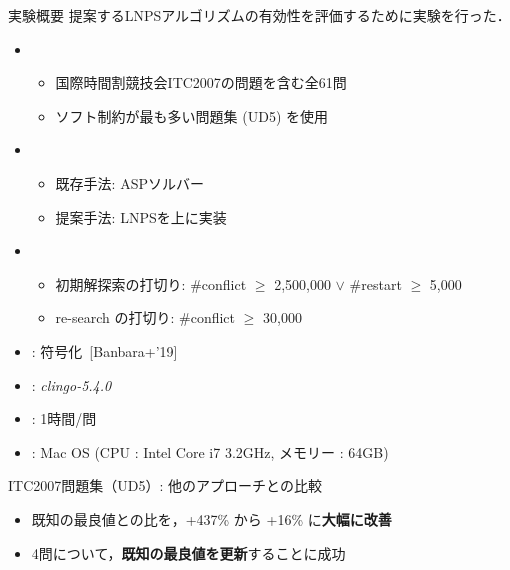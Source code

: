 \documentclass[11pt,dvipdfmx]{beamer}
\begin{document}
\begin{frame}{実験概要}
  提案するLNPSアルゴリズムの有効性を評価するために実験を行った．
  \bigskip
  \begin{itemize}
  \item {}
    \begin{itemize}
    \item 国際時間割競技会ITC2007の問題を含む全61問
    \item ソフト制約が最も多い問題集 (UD5) を使用
    \end{itemize}
  \item {}
    \begin{itemize}
    \item 既存手法: ASPソルバー{\clingo}
    \item 提案手法: LNPSを{\clingo}上に実装
    \end{itemize}
   \item {}
    \begin{itemize}
    \item 初期解探索の打切り:
      \#conflict $\geq$ 2,500,000 $\lor$ \#restart $\geq$ 5,000
     \item re-search の打切り: \#conflict $\geq$ 30,000
    \end{itemize}
  \item {}: {\teaspoon} 符号化~[Banbara+'19]
  \item {}: \textit{clingo-5.4.0}
  \item {}: 1時間/問
  \item {}: Mac OS (CPU : Intel Core i7 3.2GHz, メモリー : 64GB) 
  \end{itemize}
\end{frame}
\begin{frame}{ITC2007問題集（UD5）: 他のアプローチとの比較}
  \begin{center}
  \begin{tableB}
    
  \end{tableB}
  \end{center}
  \begin{itemize}
      \item 既知の最良値との比を，+437\% から +16\% に\alert{\bf 大幅に改善}
      \item 4問について，\alert{\bf 既知の最良値を更新}することに成功
  \end{itemize}
\end{frame}
\end{document}
